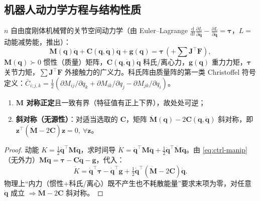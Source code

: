 \subsection{机器人动力学方程与结构性质}
\label{sec:ctrl-robot-dyn}

$n$ 自由度刚体机械臂的关节空间动力学（由 Euler--Lagrange $\frac{\mathrm d}{\mathrm dt}\frac{\partial L}{\partial\dot{\mathbf{q}}}-\frac{\partial L}{\partial\mathbf{q}}=\boldsymbol{\tau}$，$L=$ 动能减势能，推出）\cite{tedrake_underactuated}：
\begin{equation}
  \boxed{\mathbf{M}(\mathbf{q})\ddot{\mathbf{q}}+\mathbf{C}(\mathbf{q},\dot{\mathbf{q}})\dot{\mathbf{q}}+\mathbf{g}(\mathbf{q})=\boldsymbol{\tau}\,(+\textstyle\sum\mathbf{J}^\top\mathbf{F}),}
  \label{eq:ctrl-manip}
\end{equation}
$\mathbf{M}(\mathbf{q})\succ0$ 惯性（质量）矩阵，$\mathbf{C}(\mathbf{q},\dot{\mathbf{q}})\dot{\mathbf{q}}$ 科氏/离心力，$\mathbf{g}(\mathbf{q})$ 重力力矩，$\boldsymbol{\tau}$ 关节力矩，$\sum\mathbf{J}^\top\mathbf{F}$ 外接触力的广义力。科氏阵由质量阵的第一类 Christoffel 符号定义：$\bar C_{i;j,k}=\tfrac12(\partial M_{ij}/\partial q_k+\partial M_{ik}/\partial q_j-\partial M_{jk}/\partial q_i)$。

\begin{proposition}[两条承重结构性质]
\label{prop:ctrl-robot-props}
\cite{tedrake_underactuated}
\begin{enumerate}
  \item \textbf{$\mathbf{M}$ 对称正定}且一致有界（特征值有正上下界），故处处可逆；
  \item \textbf{斜对称（无源性）}：对适当选取的 $\mathbf{C}$，矩阵 $\dot{\mathbf{M}}(\mathbf{q})-2\mathbf{C}(\mathbf{q},\dot{\mathbf{q}})$ 斜对称，即 $\mathbf{z}^\top(\dot{\mathbf{M}}-2\mathbf{C})\mathbf{z}=0,\ \forall\mathbf{z}$。
\end{enumerate}
\end{proposition}
\begin{proof}
动能 $K=\tfrac12\dot{\mathbf{q}}^\top\mathbf{M}\dot{\mathbf{q}}$，求时间导 $\dot K=\dot{\mathbf{q}}^\top\mathbf{M}\ddot{\mathbf{q}}+\tfrac12\dot{\mathbf{q}}^\top\dot{\mathbf{M}}\dot{\mathbf{q}}$。由 \cref{eq:ctrl-manip}（无外力）$\mathbf{M}\ddot{\mathbf{q}}=\boldsymbol{\tau}-\mathbf{C}\dot{\mathbf{q}}-\mathbf{g}$，代入：
\[
  \dot K=\dot{\mathbf{q}}^\top\boldsymbol{\tau}-\dot{\mathbf{q}}^\top\mathbf{g}+\tfrac12\dot{\mathbf{q}}^\top(\dot{\mathbf{M}}-2\mathbf{C})\dot{\mathbf{q}}.
\]
物理上“内力（惯性+科氏/离心）既不产生也不耗散能量”要求末项为零，对任意 $\dot{\mathbf{q}}$ 成立 $\Rightarrow\dot{\mathbf{M}}-2\mathbf{C}$ 斜对称。
\end{proof}

